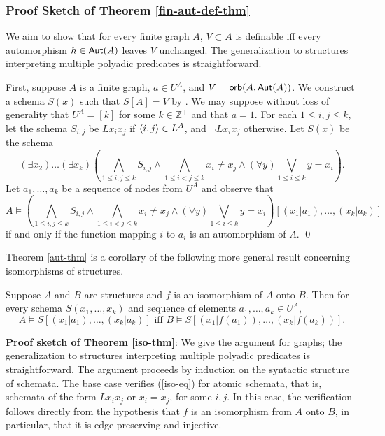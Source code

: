 \subsubsection*{Proof Sketch of Theorem \ref{fin-aut-def-thm}}
We aim to show that for every finite graph $A$, $V \subset A$ is definable iff every automorphism $h \in \mbox{$\mathsf{Aut}(A)$}$ leaves $V$ unchanged. The generalization to structures interpreting multiple polyadic predicates is straightforward.

First, suppose $A$ is a finite graph, $a\in U^A$, and $V=\mbox{$\mathsf{orb}(A,\mbox{$\mathsf{Aut}(A)$})$}$. We construct a schema $S(x)$ such that $S[A]=V$ by . We may suppose without loss of generality that $U^A=[k]$ for some $k\in\mathbb{Z}^+$ and that $a=1$. For each $1\leq i,j\leq k$, let the schema $S_{i,j}$ be $Lx_ix_j$ if $\mbox{$\langle i,j \rangle$}\in L^A$, and $\neg Lx_ix_j$ otherwise. Let $S(x)$ be the schema
\[
(\exists x_2)\ldots(\exists x_k)(\bigwedge_{1\leq i,j\leq k}S_{i,j}\wedge\bigwedge_{1\leq i<j\leq k}x_i\neq x_j\wedge(\forall y)\bigvee_{1\leq i\leq k} y=x_i).
\] 
Let $a_1,\dots,a_k$ be a sequence of nodes from $U^A$ and observe that
\[
A\models(\bigwedge_{1\leq i,j\leq k}S_{i,j}\wedge\bigwedge_{1\leq i<j\leq k}x_i\neq x_j\wedge(\forall y)\bigvee_{1\leq i\leq k} y=x_i)[(x_1|a_1),\ldots,(x_k|a_k)]
\]
if and only if the function mapping $i$ to $a_i$ is an automorphism of $A$. \qed


Theorem \ref{aut-thm} is a corollary of the following more general result concerning isomorphisms of structures.
\iffalse
\begin{theorem}\label{iso-thm}
Suppose $A$ and $B$ are structures and $f$ is an isomorphism of $A$ onto $B$. Then for every schema $S(x_1,\ldots,x_k)$ and sequence of elements $a_1,\dots,a_k\in U^A$,
\begin{equation}\label{iso-eq}
A\models S[(x_1|a_1),\ldots,(x_k|a_k)]\mbox{ iff }B\models S[(x_1|f(a_1)),\ldots,(x_k|f(a_k))].
\end{equation}
\end{theorem}

{\bf Proof sketch of Theorem \ref{iso-thm}}:
We give the argument for graphs; the generalization to structures interpreting multiple polyadic predicates is straightforward.
The argument proceeds by induction on the syntactic structure of schemata. The base case verifies (\ref{iso-eq}) for atomic schemata, that is, schemata of the form $Lx_ix_j$ or $x_i=x_j$, for some $i,j$. In this case, the verification follows directly from the hypothesis that $f$ is an isomorphism from $A$ onto $B$, in particular, that it is edge-preserving and injective.

